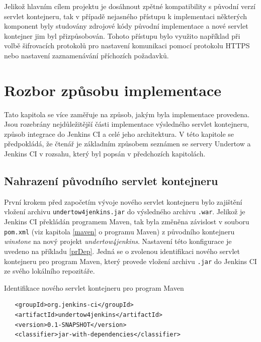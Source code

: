         \medskip
        Jelikož hlavním cílem projektu je dosáhnout zpětné kompatibility s původní verzí servlet kontejneru,
        tak v případě nejasného přístupu k implementaci některých komponent byly studovány zdrojové kódy
        původní implementace a nové servlet kontejner jim byl přizpůsobován. Tohoto přístupu bylo využito
        například při volbě šifrovacích protokolů pro nastavení komunikaci pomocí protokolu HTTPS nebo nastavení zaznamenávání
        příchozích požadavků.
        
     \section{Rozbor způsobu implementace}
        Tato kapitola se více zaměřuje na způsob, jakým byla implementace provedena. Jsou rozebrány nejdůležitější
        části implementace výsledného servlet kontejneru, způsob integrace do Jenkins CI
        a celé jeho architektura. V této kapitole se předpokládá, že čtenář je
        základním způsobem seznámen se servery Undertow a Jenkins CI v rozsahu, který byl popsán
        v předchozích kapitolách.


        \subsection{Nahrazení původního servlet kontejneru}
            První krokem před započetím vývoje nového servlet kontejneru bylo zajištění vložení archivu \texttt{undertow4jenkins.jar} 
            do výsledného archivu \texttt{.war}.
            Jelikož je Jenkins CI překládán programem Maven, tak byla změněna závislost v souboru \texttt{pom.xml} 
            (viz kapitola \ref{maven} o programu Maven)
            z původního kontejneru \emph{winstone} na nový projekt \emph{undertow4jenkins}.
            Nastavení této konfigurace je uvedeno na příkladu \ref{prDep}. Jedná se o zvolenou identifikaci nového servlet
            kontejneru pro program Maven, který provede vložení archivu \texttt{.jar} do Jenkins CI ze svého lokálního repozitáře.

\begin{priklad} \label{prDep} Identifikace nového servlet kontejneru pro program Maven 
\begin{verbatim}
   <groupId>org.jenkins-ci</groupId>
   <artifactId>undertow4jenkins</artifactId>
   <version>0.1-SNAPSHOT</version>
   <classifier>jar-with-dependencies</classifier>
\end{verbatim}
\end{priklad}

